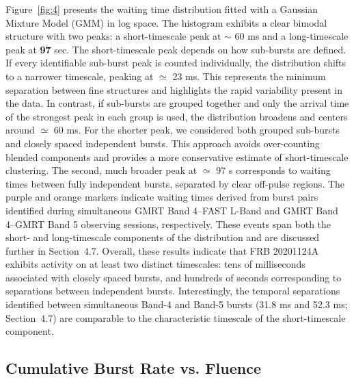 \documentclass[preprint2, trackchanges]{aastex631}
\begin{document}
Figure~\ref{fig:4} presents the waiting time distribution fitted with a Gaussian Mixture Model (GMM) in log space. The histogram exhibits a clear bimodal structure with two peaks: a short-timescale peak at $\sim$ 60 ms and a long-timescale peak at \textbf{97} sec. The short-timescale peak depends on how sub-bursts are defined. If every identifiable sub-burst peak is counted individually, the distribution shifts to a narrower timescale, peaking at $\simeq$ 23 ms. This represents the minimum separation between fine structures and highlights the rapid variability present in the data. In contrast, if sub-bursts are grouped together and only the arrival time of the strongest peak in each group is used, the distribution broadens and centers around $\simeq$ 60 ms. For the shorter peak, we considered both grouped sub-bursts and closely spaced independent bursts. This approach avoids over-counting blended components and provides a more conservative estimate of short-timescale clustering. The second, much broader peak at $\simeq$ 97 s corresponds to waiting times between fully independent bursts, separated by clear off-pulse regions. The purple and orange markers indicate waiting times derived from burst pairs identified during simultaneous GMRT Band 4--FAST L-Band and GMRT Band 4--GMRT Band 5 observing sessions, respectively. These events span both the short- and long-timescale components of the distribution and are discussed further in Section~4.7. Overall, these results indicate that FRB 20201124A exhibits activity on at least two distinct timescales: tens of milliseconds associated with closely spaced bursts, and hundreds of seconds corresponding to separations between independent bursts. Interestingly, the temporal separations identified between simultaneous Band-4 and Band-5 bursts (31.8 ms and 52.3 ms; Section~4.7) are comparable to the characteristic timescale of the short-timescale component. 

\subsection{Cumulative Burst Rate vs. Fluence}
\end{document}
